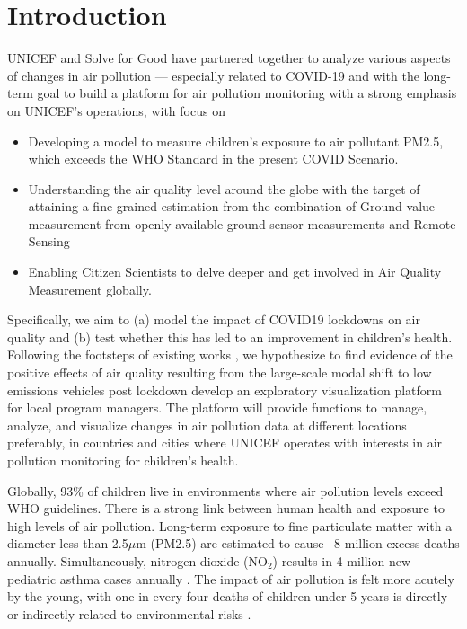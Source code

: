 \section{Introduction}\label{sec:intro}
UNICEF and Solve for Good have partnered together to analyze various aspects of changes in air pollution — especially related to COVID-19 and with the long-term goal to build a platform for air pollution monitoring with a strong emphasis on UNICEF’s operations, with focus on
\begin{itemize}
    \item Developing a model to measure children’s exposure to air pollutant PM2.5, which exceeds the WHO Standard in the present COVID Scenario.
    \item Understanding the air quality level around the globe with the target of attaining a fine-grained estimation from the combination of Ground value measurement from openly available ground sensor measurements and Remote Sensing
    \item Enabling Citizen Scientists to delve deeper and get involved in Air Quality Measurement globally.
\end{itemize} 
%
Specifically, we aim to (a) model the impact of COVID19 lockdowns on air quality and (b) test whether this has led to an improvement in children’s health. Following the footsteps of existing works \cite{Borneman,Mahato}, we hypothesize to find evidence of the positive effects of air quality resulting from the large-scale modal shift to low emissions vehicles post lockdown develop an exploratory visualization platform for local program managers. The platform will provide functions to manage, analyze, and visualize changes in air pollution data at different locations preferably, in countries and cities where UNICEF operates with interests in air pollution monitoring for children’s health.

Globally, 93\% of children live in environments where air pollution levels exceed WHO guidelines. There is a strong link between human health and exposure to high levels of air pollution. Long-term exposure to fine particulate matter with a diameter less than 2.5$\mu$m (PM2.5) are estimated to cause ~8 million excess deaths annually. Simultaneously, nitrogen dioxide (NO$_2$) results in 4 million new pediatric asthma cases annually \cite{Venter}. The impact of air pollution is felt more acutely by the young, with one in every four deaths of children under 5 years is directly or indirectly related to environmental risks \cite{who}.

